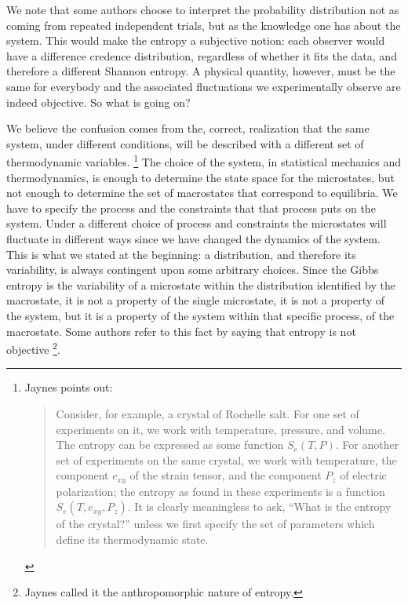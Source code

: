 \documentclass[iopart]{revtex4-1}
\begin{document}
We note that some authors choose to interpret the probability distribution not as coming from repeated independent trials, but as the knowledge one has about the system. This would make the entropy a subjective notion: each observer would have a difference credence distribution, regardless of whether it fits the data, and therefore a different Shannon entropy. A physical quantity, however, must be the same for everybody and the associated fluctuations we experimentally observe are indeed objective. So what is going on?

We believe the confusion comes from the, correct, realization that the same system, under different conditions, will be described with a different set of thermodynamic variables. \footnote{Jaynes\cite{Jaynes} points out:
\begin{quote}
 		Consider, for example, a crystal of Rochelle salt. For one set of experiments on it, we work with temperature, pressure, and volume. The entropy can be expressed as some function $S_e(T,P)$. For another set of experiments on the same crystal, we work with temperature, the component $e_{xy}$ of the strain tensor, and the component $P_z$ of electric polarization; the entropy as found in these experiments is a function $S_e(T,e_{xy},P_z)$. It is clearly  meaningless to ask, ``What is the entropy of the crystal?''  unless we first specify the set of parameters which define its thermodynamic state.
\end{quote}}
The choice of the system, in statistical mechanics and thermodynamics, is enough to determine the state space for the microstates, but not enough to determine the set of macrostates that correspond to equilibria. We have to specify the process and the constraints that that process puts on the system. Under a different choice of process and constraints the microstates will fluctuate in different ways since we have changed the dynamics of the system. This is what we stated at the beginning: a distribution, and therefore its variability, is always contingent upon some arbitrary choices. Since the Gibbs entropy is the variability of a microstate within the distribution identified by the macrostate, it is not a property of the single microstate, it is not a property of the system, but it is a property of the system within that specific process, of the macrostate. Some authors refer to this fact by saying that entropy is not objective \footnote{Jaynes\cite{Jaynes,Jaynes2} called it the anthropomorphic nature of entropy.}. 
\end{document}
